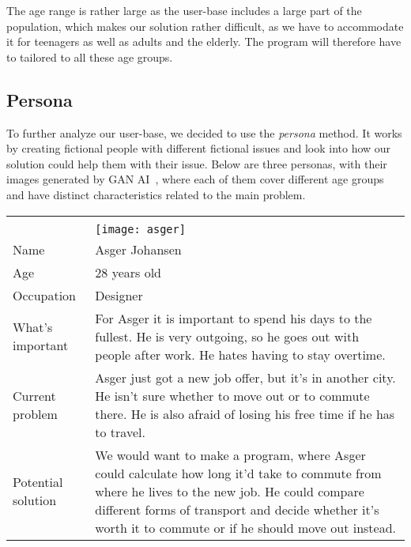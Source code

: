 The age range is rather large as the user-base includes a large part of the population, which makes our solution rather
difficult, as we have to accommodate it for teenagers as well as adults and the elderly.
The program will therefore have to tailored to all these age groups.

\subsection{Persona}\label{subsec:persona}

To further analyze our user-base, we decided to use the \textit{persona} method.
It works by creating fictional people with different fictional issues and look into how our solution could help them
with their issue.
Below are three personas, with their images generated by GAN AI~\cite{thispersondoesnotexist}, where each of them
cover different age groups and have distinct characteristics related to the main problem.


\renewcommand{\arraystretch}{1.5}

\noindent
\begin{tabularx}{\textwidth}{ | l X | }
    \hline
    &                                               \\
    & \texttt{[image: asger]} \\
    Name       & Asger Johansen                                \\
    Age        & 28 years old                                  \\
    Occupation & Designer                                      \\
    What's important & For Asger it is important to spend his days to the fullest.
    He is very outgoing, so he goes out with people after work.
    He hates having to stay overtime. \\
    Current problem & Asger just got a new job offer, but it's in another city.
    He isn't sure whether to move out or to commute there.
    He is also afraid of losing his free time if he has to travel. \\
    Potential solution & We would want to make a program, where Asger could calculate how long it'd take to commute from
    where he lives to the new job.
    He could compare different forms of transport and decide whether it's worth it to commute or if he should move out
    instead. \\
    \hline
\end{tabularx}

